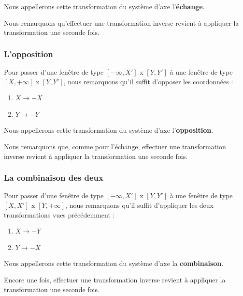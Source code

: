 \documentclass[10pt,a4paper]{article}
\begin{document}
Nous appellerons cette transformation du système d'axe l'\textbf{échange}.

Nous remarquons qu'effectuer une transformation inverse revient à appliquer la transformation une seconde fois.

\subsubsection{L'opposition}
Pour passer d'une fenêtre de type $[-\infty, X']$ x $[Y, Y']$ à une fenêtre de type $[X, +\infty]$ x $[Y, Y']$, nous remarquons qu'il suffit d'opposer les coordonnées :
\begin{enumerate}
	\item $X \rightarrow -X$
	\item $Y \rightarrow -Y$
\end{enumerate}

Nous appellerons cette transformation du système d'axe l'\textbf{opposition}.

Nous remarquons que, comme pour l'échange, effectuer une transformation inverse revient à appliquer la transformation une seconde fois.

\subsubsection{La combinaison des deux}
Pour passer d'une fenêtre de type $[-\infty, X']$ x $[Y, Y']$ à une fenêtre de type $[X, X']$ x $[Y, +\infty]$, nous remarquons qu'il suffit d'appliquer les deux transformations vues précédemment :
\begin{enumerate}
	\item $X \rightarrow -Y$
	\item $Y \rightarrow -X$
\end{enumerate}

Nous appellerons cette transformation du système d'axe la \textbf{combinaison}.

Encore une fois, effectuer une transformation inverse revient à appliquer la transformation une seconde fois.
\end{document}
